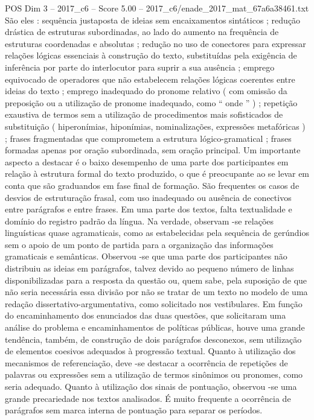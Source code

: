 \begin{textsample}{POS Dim 3 – 2017\_c6 – Score 5.00 – 2017\_c6/enade\_2017\_mat\_67a6a38461.txt}
São eles : sequência justaposta de ideias sem encaixamentos sintáticos ; redução drástica de estruturas subordinadas, ao lado do aumento na frequência de estruturas coordenadas e absolutas ; redução no uso de conectores para expressar relações lógicas essenciais à construção do texto, substituídas pela exigência de inferência por parte do interlocutor para suprir a sua ausência ; emprego equivocado de operadores que não estabelecem relações lógicas coerentes entre ideias do texto ; emprego inadequado do pronome relativo ( com omissão da preposição ou a utilização de pronome inadequado, como “ onde ” ) ; repetição exaustiva de termos sem a utilização de procedimentos mais sofisticados de substituição ( hiperonímias, hiponímias, nominalizações, expressões metafóricas ) ; frases fragmentadas que comprometem a estrutura lógico-gramatical ; frases formadas apenas por oração subordinada, sem oração principal.
Um importante aspecto a destacar é o baixo desempenho de uma parte dos participantes em relação à estrutura formal do texto produzido, o que é preocupante ao se levar em conta que são graduandos em fase final de formação.
São frequentes os casos de desvios de estruturação frasal, com uso inadequado ou ausência de conectivos entre parágrafos e entre frases.
Em uma parte dos textos, falta textualidade e domínio do registro padrão da língua.
Na verdade, observam -se relações linguísticas quase agramaticais, como as estabelecidas pela sequência de gerúndios sem o apoio de um ponto de partida para a organização das informações gramaticais e semânticas.
Observou -se que uma parte dos participantes não distribuiu as ideias em parágrafos, talvez devido ao pequeno número de linhas disponibilizadas para a resposta da questão ou, quem sabe, pela suposição de que não seria necessária essa divisão por não se tratar de um texto no modelo de uma redação dissertativo-argumentativa, como solicitado nos vestibulares.
Em função do encaminhamento dos enunciados das duas questões, que solicitaram uma análise do problema e encaminhamentos de políticas públicas, houve uma grande tendência, também, de construção de dois parágrafos desconexos, sem utilização de elementos coesivos adequados à progressão textual.
Quanto à utilização dos mecanismos de referenciação, deve -se destacar a ocorrência de repetições de palavras ou expressões sem a utilização de termos sinônimos ou pronomes, como seria adequado.
Quanto à utilização dos sinais de pontuação, observou -se uma grande precariedade nos textos analisados.
É muito frequente a ocorrência de parágrafos sem marca interna de pontuação para separar os períodos.

\end{textsample}
